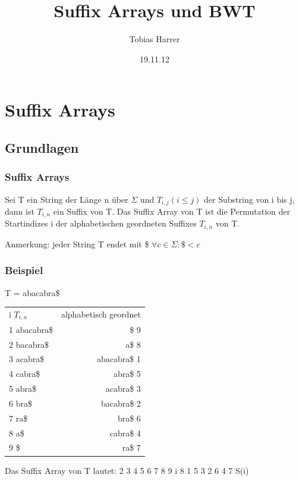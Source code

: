 \documentclass{beamer}
\title{Suffix Arrays und BWT}
\author{Tobias Harrer}
\date{19.11.12}
\begin{document}
\maketitle
\frame{\tableofcontents[currentsection]}
 
\section{Suffix Arrays}
\subsection{Grundlagen}
\begin{frame} %
  \frametitle{Suffix Arrays} %
  \begin{Definition} %
    Sei T ein String der Länge n über $\Sigma$ und $T_{i,j} (i\leq j)$ der Substring von i bis j, dann ist $T_{i,n}$ ein Suffix von T. Das Suffix Array von T ist die Permutation der Startindizes i der alphabetischen geordneten Suffixes $T_{i,n}$ von T.
  \end{Definition}
  Anmerkung: jeder String T endet mit \$ \newline
  $\forall c \in \Sigma : \$ < c$
\end{frame}
\begin{frame}
\frametitle{Beispiel} %
T = \glqq abacabra\$\grqq\newline
	\begin{tabular}{l r}
	i $T_{i,n}$ & alphabetisch geordnet\\
1 abacabra\$ & \$ 9\\
2 bacabra\$ & a\$ 8\\
3 acabra\$ & abacabra\$ 1\\
4 cabra\$ & abra\$ 5\\
5 abra\$ & acabra\$ 3\\
6 bra\$ & bacabra\$ 2\\
7 ra\$ & bra\$ 6\\
8 a\$ & cabra\$ 4\\
9 \$ & ra\$ 7\\
	\end{tabular}
	\newline
	Das Suffix Array von T lautet:  2 3 4 5 6 7 8 9 \textrightarrow i 8 1 5 3 2 6 4 7 \textrightarrow S(i)
\end{frame}
\end{document}
